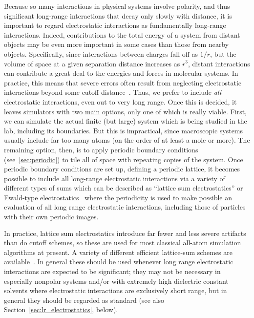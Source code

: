 \documentclass[9pt,bestpractices]{livecoms}
\begin{document}
Because so many interactions in physical systems involve polarity, and thus significant long-range interactions that decay only slowly with distance, it is important to regard electrostatic interactions as fundamentally long-range interactions.
Indeed, contributions to the total energy of a system from distant objects may be even more important in some cases than those from nearby objects.
Specifically, since interactions between charges fall off as $1/r$, but the volume of space at a given separation distance increases as $r^3$, distant interactions can contribute a great deal to the energies and forces in molecular systems.
In practice, this means that severe errors often result from neglecting electrostatic interactions beyond some cutoff distance~\cite{Leachbook, York:1993:J.Chem.Phys., Darden:1993:J.Chem.Phys., Piana:2012:PLOSONE, Sagui:1999:Annu.Rev.Biophys.Biomol.Struct.}. 
Thus, we prefer to include \emph{all} electrostatic interactions, even out to very long range. 
Once this is decided, it  leaves simulators with two main options, only one of which is really viable.
First, we can simulate the actual finite (but large) system which is being studied in the lab, including its boundaries.
But this is impractical, since macroscopic systems usually include far too many atoms (on the order of at least a mole or more).
The remaining option, then, is to apply periodic boundary conditions (see~\ref{sec:periodic}) to tile all of space with repeating copies of the system. 
Once periodic boundary conditions are set up, defining a periodic lattice, it becomes possible to include all long-range electrostatic interactions via a variety of different types of sums which can be described as ``lattice sum electrostatics'' or Ewald-type electrostatics~\cite{Sagui:1999:Annu.Rev.Biophys.Biomol.Struct., Cisneros:2014:Chem.Rev.} where the periodicity is used to make possible an evaluation of all long range electrostatic interactions, including those of particles with their own periodic images.

In practice, lattice sum electrostatics introduce far fewer and less severe artifacts than do cutoff schemes, so these are used for most classical all-atom simulation algorithms at present. 
A variety of different efficient lattice-sum schemes are available~\cite{Cisneros:2014:Chem.Rev.}.
In general these should be used whenever long range electrostatic interactions are expected to be significant; they may not be necessary in especially nonpolar systems and/or with extremely high dielectric constant solvents where electrostatic interactions are exclusively short range, but in general they should be regarded as standard (see also Section~\ref{sec:lr_electrostatics}, below). 
\end{document}
